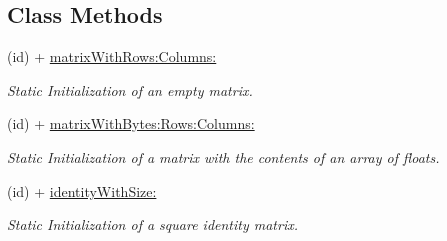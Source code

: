 \subsection*{Class Methods}
\begin{DoxyCompactItemize}
\item 
(id) + \hyperlink{interface_r_r_matrix2_d_a457c3530492815ba58e491c9e04bb666}{matrix\-With\-Rows\-:\-Columns\-:}
\begin{DoxyCompactList}\small\item\em Static Initialization of an empty matrix. \end{DoxyCompactList}\item 
(id) + \hyperlink{interface_r_r_matrix2_d_ab258506be55447b8ddad7792db90f49f}{matrix\-With\-Bytes\-:\-Rows\-:\-Columns\-:}
\begin{DoxyCompactList}\small\item\em Static Initialization of a matrix with the contents of an array of floats. \end{DoxyCompactList}\item 
(id) + \hyperlink{interface_r_r_matrix2_d_aeef302e8ad30db10d859782bf64d2679}{identity\-With\-Size\-:}
\begin{DoxyCompactList}\small\item\em Static Initialization of a square identity matrix. \end{DoxyCompactList}\end{DoxyCompactItemize}
